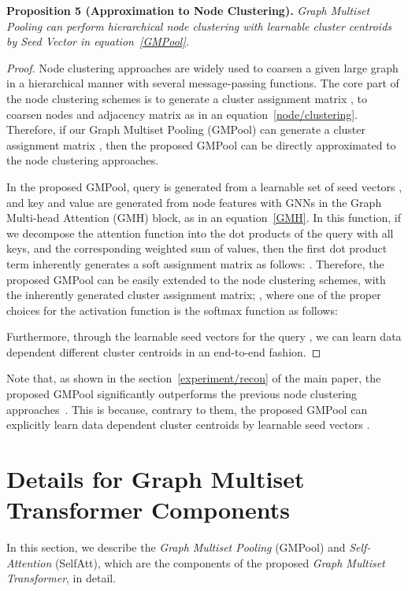 \documentclass{article} \usepackage{iclr2021_conference,times}
\begin{document}
\textbf{Proposition 5 (Approximation to Node Clustering).} \emph{Graph Multiset Pooling  can perform hierarchical node clustering with learnable  cluster centroids by Seed Vector  in equation~\ref{GMPool}.}

\begin{proof}
Node clustering approaches are widely used to coarsen a given large graph in a hierarchical manner with several message-passing functions. The core part of the node clustering schemes is to generate a cluster assignment matrix , to coarsen nodes and adjacency matrix as in an equation~\ref{node/clustering}. Therefore, if our Graph Multiset Pooling (GMPool) can generate a cluster assignment matrix , then the proposed GMPool can be directly approximated to the node clustering approaches.

In the proposed GMPool, query  is generated from a learnable set of  seed vectors , and key  and value  are generated from node features  with GNNs in the Graph Multi-head Attention (GMH) block, as in an equation~\ref{GMH}. In this function, if we decompose the attention function  into the dot products of the query with all keys, and the corresponding weighted sum of values, then the first dot product term inherently generates a soft assignment matrix as follows: . Therefore, the proposed GMPool can be easily extended to the node clustering schemes, with the inherently generated cluster assignment matrix; , where one of the proper choices for the activation function  is the softmax function as follows: 


Furthermore, through the learnable seed vectors  for the query , we can learn data dependent  different cluster centroids in an end-to-end fashion.
\end{proof}

Note that, as shown in the section~\ref{experiment/recon} of the main paper, the proposed GMPool significantly outperforms the previous node clustering approaches~\citep{DiffPool, MincutPool}. This is because, contrary to them, the proposed GMPool can explicitly learn data dependent  cluster centroids by learnable seed vectors .

\section{Details for Graph Multiset Transformer Components \label{appendix/model/detail}}
In this section, we describe the \emph{Graph Multiset Pooling} (GMPool) and \emph{Self-Attention} (SelfAtt), which are the components of the proposed \emph{Graph Multiset Transformer}, in detail.
\end{document}
